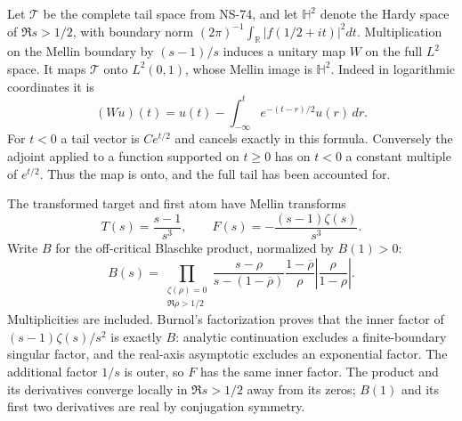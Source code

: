 \documentclass[11pt]{article}
\theoremstyle{remark}
\begin{document}
Let $\mathcal T$ be the complete tail space from NS-74, and let
$\mathbb H^2$ denote the Hardy space of $\Re s>1/2$, with boundary norm
$(2\pi)^{-1}\int_{\mathbb R}|f(1/2+it)|^2dt$.
Multiplication on the Mellin boundary by $(s-1)/s$ induces a unitary
map $W$ on the full $L^2$ space. It maps $\mathcal T$ onto
$L^2(0,1)$, whose Mellin image is $\mathbb H^2$.
Indeed in logarithmic coordinates it is
\[
 (Wu)(t)=u(t)-\int_{-\infty}^t e^{-(t-r)/2}u(r)\,dr.
\]
For $t<0$ a tail vector is $C e^{t/2}$ and cancels exactly in this
formula. Conversely the adjoint applied to a function supported on
$t\geq0$ has on $t<0$ a constant multiple of $e^{t/2}$.
Thus the map is onto, and the full tail has been accounted for.

The transformed target and first atom have Mellin transforms
\[
 T(s)=\frac{s-1}{s^3},\qquad
 F(s)=-\frac{(s-1)\zeta(s)}{s^3}.
\]
Write $B$ for the off-critical Blaschke product, normalized by $B(1)>0$:
\[
 B(s)=\prod_{\substack{\zeta(\rho)=0\\\Re\rho>1/2}}
 \frac{s-\rho}{s-(1-\overline\rho)}
 \frac{1-\overline\rho}{\rho}
 \left|\frac{\rho}{1-\rho}\right|.
\]
Multiplicities are included. Burnol's factorization proves that the
inner factor of $(s-1)\zeta(s)/s^2$ is exactly $B$: analytic
continuation excludes a finite-boundary singular factor, and the
real-axis asymptotic excludes an exponential factor. The additional
factor $1/s$ is outer, so $F$ has the same inner factor. The product
and its derivatives converge locally in $\Re s>1/2$ away from its
zeros; $B(1)$ and its first two derivatives are real by conjugation
symmetry.
\end{document}

